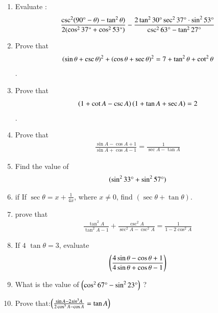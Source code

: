 \begin{enumerate}[label=\thesubsection.\arabic*.,ref=\thesubsection.\theenumi]
\hfill{}\item Evaluate :
\begin{align*}
    {\frac{\csc^2(90\degree - \theta)-\tan^2\theta)}{2(\cos^2 37\degree + \cos^2 53\degree)}} - {\frac{2\tan^2 30\degree \sec^2 37\degree \cdot \sin^2 53\degree}{\csc^2 63\degree - \tan^2 27\degree}} 
\end{align*}	




  \hfill{}\item Prove that \begin{align*} \left(\sin\theta + \csc\theta\right)^2 + \left(\cos\theta + \sec\theta\right)^2 = 7 + \tan^2\theta + \cot^2\theta\end{align*}.
  \hfill{}\item Prove that \begin{align*}\left(1+\cot A - \csc A\right) \left(1 + \tan A +\sec A\right) = 2 \end{align*}.
  \hfill{}\item Prove that \begin{align*} \frac{\sin A-\cos A+1}{\sin A+ \cos A-1} =\frac{1}{\sec A-\tan A}\end{align*}
  \hfill{}
\item Find the value of \begin{align*}(\sin^2 33\degree+ \sin^2 57\degree)\end{align*}
  
  
  \hfill{}\item if If $\sec\theta = x + \frac{1}{4x}$, where $x \neq 0$, find $(\sec\theta + \tan\theta)$.
  \hfill{}\item prove that \begin{align*} \frac{\tan^2A}{\tan^2 A-1}+\frac{\csc^2 A}{\sec^2 A-\csc^2 A}=\frac{1}{1-2\cos^2 A}\end{align*}
\hfill{}
\item If $4$ $\tan\theta=3$, evaluate \begin{align*}\left(\frac{4 \sin\theta - \cos\theta + 1 }{ 4 \sin\theta + \cos\theta - 1 } \right) \end{align*}   

\hfill{}
\item What is the value of $ \left(\cos^2 67\degree - \sin^2 23\degree\right)$ ?

\hfill{}\item  Prove that:$\left(\frac{\sin A - 2sin^3 A}{2 \cos^3 A-\cos A} = \tan A \right)$


\end{enumerate}
